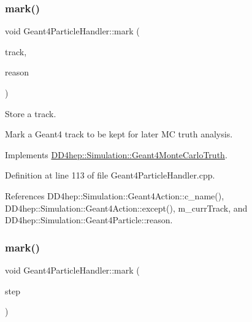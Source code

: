 \subsubsection{\texorpdfstring{mark()}{mark()}\hspace{0.1cm}{\footnotesize\ttfamily [2/4]}}
{\footnotesize\ttfamily void Geant4\+Particle\+Handler\+::mark (\begin{DoxyParamCaption}\item[{const G4\+Track $\ast$}]{track,  }\item[{int}]{reason }\end{DoxyParamCaption})\hspace{0.3cm}{\ttfamily [virtual]}}



Store a track. 

Mark a Geant4 track to be kept for later MC truth analysis. 

Implements \hyperlink{class_d_d4hep_1_1_simulation_1_1_geant4_monte_carlo_truth_a6b63ab3d0ac424aba1088fb9ea2994dc}{D\+D4hep\+::\+Simulation\+::\+Geant4\+Monte\+Carlo\+Truth}.



Definition at line 113 of file Geant4\+Particle\+Handler.\+cpp.



References D\+D4hep\+::\+Simulation\+::\+Geant4\+Action\+::c\+\_\+name(), D\+D4hep\+::\+Simulation\+::\+Geant4\+Action\+::except(), m\+\_\+curr\+Track, and D\+D4hep\+::\+Simulation\+::\+Geant4\+Particle\+::reason.

\hypertarget{class_d_d4hep_1_1_simulation_1_1_geant4_particle_handler_aa03024ccc930c57fcfcd515605072f4b}{}\label{class_d_d4hep_1_1_simulation_1_1_geant4_particle_handler_aa03024ccc930c57fcfcd515605072f4b} 
\subsubsection{\texorpdfstring{mark()}{mark()}\hspace{0.1cm}{\footnotesize\ttfamily [3/4]}}
{\footnotesize\ttfamily void Geant4\+Particle\+Handler\+::mark (\begin{DoxyParamCaption}\item[{const G4\+Step $\ast$}]{step }\end{DoxyParamCaption})\hspace{0.3cm}{\ttfamily [virtual]}}



